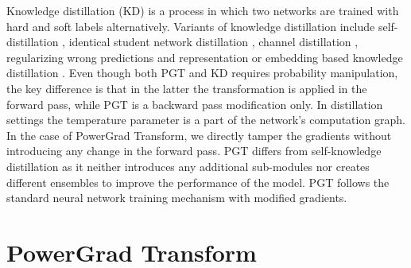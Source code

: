 \documentclass[runningheads]{llncs}
\begin{document}
Knowledge distillation (KD) \cite{hinton2015distilling} is a process in which two
networks are trained with hard and soft labels alternatively. Variants of knowledge
distillation include self-distillation \cite{zhang2018deep}, identical student network
distillation \cite{furlanello2018born}, channel distillation \cite{ge2019distilling},
regularizing wrong predictions \cite{yun2020regularizing} and representation or
embedding based knowledge distillation \cite{yao2018deep}. Even though both PGT and KD
requires probability manipulation, the key difference is that in the latter the
transformation is applied in the forward pass, while PGT is a backward pass modification
only. In distillation settings the temperature parameter is a part of the network's
computation graph. In the case of PowerGrad Transform, we directly tamper the gradients
without introducing any change in the forward pass. PGT differs from self-knowledge
distillation as it neither introduces any additional sub-modules nor creates different
ensembles to improve the performance of the model. PGT follows the standard neural
network training mechanism with modified gradients.

\section{PowerGrad Transform}
\label{sec:Powe}
\end{document}
